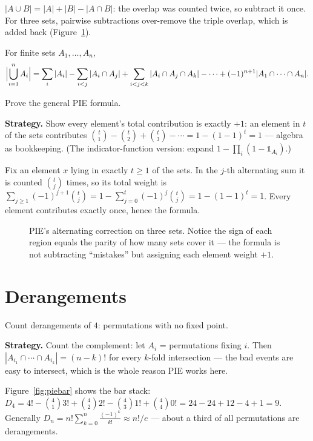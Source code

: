$|A \cup B| = |A| + |B| - |A\cap B|$: the overlap was counted twice, so
subtract it once. For three sets, pairwise subtractions over-remove the
triple overlap, which is added back (Figure~\ref{fig:pievenn}).

\begin{theorem}
For finite sets $A_1, \dots, A_n$,
\[
\Bigl|\bigcup_{i=1}^{n} A_i\Bigr|
= \sum_i |A_i| - \sum_{i<j} |A_i \cap A_j|
  + \sum_{i<j<k} |A_i \cap A_j \cap A_k| - \cdots
  + (-1)^{n+1} |A_1 \cap \cdots \cap A_n|.
\]
\end{theorem}

\begin{example}\label{ex:pieproof}
Prove the general PIE formula.
\par\smallskip
\textbf{Strategy.} Show every element's total contribution is exactly
$+1$: an element in $t$ of the sets contributes
$\binom{t}{1} - \binom{t}{2} + \binom{t}{3} - \cdots = 1 - (1-1)^t = 1$ ---
algebra as bookkeeping. (The indicator-function version: expand
$1 - \prod_i (1 - \mathbb{1}_{A_i})$.)
\par\smallskip
\begin{solution}
Fix an element $x$ lying in exactly $t \ge 1$ of the sets. In the
$j$-th alternating sum it is counted $\binom{t}{j}$ times, so its total
weight is $\sum_{j \ge 1} (-1)^{j+1}\binom{t}{j}
= 1 - \sum_{j=0}^{t}(-1)^j\binom{t}{j} = 1 - (1-1)^t = 1$. Every
element contributes exactly once, hence the formula.
\end{solution}
\end{example}

\begin{figure}[ht]\centering

\caption{PIE's alternating correction on three sets. Notice the sign of
each region equals the parity of how many sets cover it --- the formula
is not subtracting ``mistakes'' but assigning each element weight $+1$.}
\label{fig:pievenn}
\end{figure}

\section{Derangements}\label{sec:derange}

\begin{example}\label{ex:derange}
Count derangements of $4$: permutations with no fixed point.
\par\smallskip
\textbf{Strategy.} Count the complement: let $A_i$ = permutations
fixing $i$. Then $|A_{i_1} \cap \cdots \cap A_{i_k}| = (n-k)!$ for every
$k$-fold intersection --- the bad events are easy to intersect, which is
the whole reason PIE works here.
\par\smallskip
\begin{solution}
Figure~\ref{fig:piebar} shows the bar stack:
$D_4 = 4! - \binom{4}{1}3! + \binom{4}{2}2! - \binom{4}{3}1!
+ \binom{4}{4}0! = 24 - 24 + 12 - 4 + 1 = 9$.
Generally $D_n = n!\sum_{k=0}^{n} \frac{(-1)^k}{k!} \approx n!/e$ ---
about a third of all permutations are derangements.
\end{solution}
\end{example}

